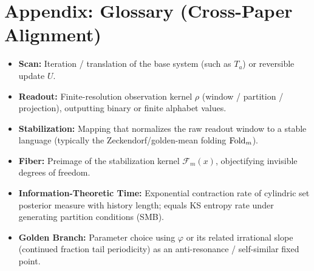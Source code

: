 \section{Appendix: Glossary (Cross-Paper Alignment)}

\begin{itemize}
  \item \textbf{Scan:} Iteration / translation of the base system (such as $T_a$) or reversible update $U$.
  \item \textbf{Readout:} Finite-resolution observation kernel $\rho$ (window / partition / projection), outputting binary or finite alphabet values.
  \item \textbf{Stabilization:} Mapping that normalizes the raw readout window to a stable language (typically the Zeckendorf/golden-mean folding $\mathrm{Fold}_m$).
  \item \textbf{Fiber:} Preimage of the stabilization kernel $\mathcal{F}_m(x)$, objectifying invisible degrees of freedom.
  \item \textbf{Information-Theoretic Time:} Exponential contraction rate of cylindric set posterior measure with history length; equals KS entropy rate under generating partition conditions (SMB).
  \item \textbf{Golden Branch:} Parameter choice using $\varphi$ or its related irrational slope (continued fraction tail periodicity) as an anti-resonance / self-similar fixed point.
\end{itemize}


